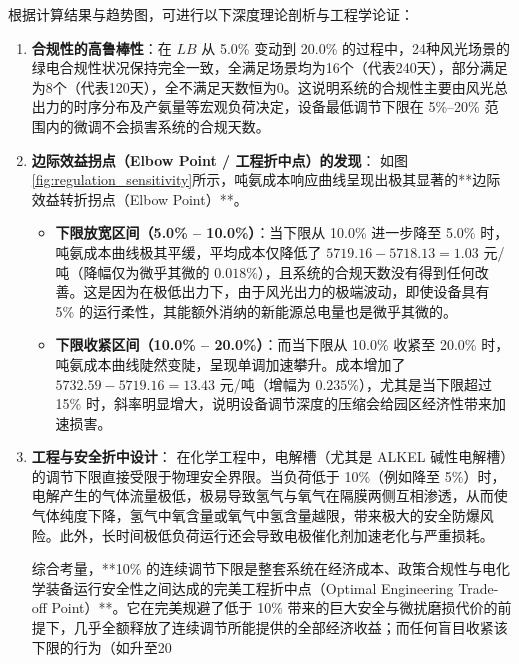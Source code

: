 根据计算结果与趋势图，可进行以下深度理论剖析与工程学论证：
\begin{enumerate}
    \item \textbf{合规性的高鲁棒性}：在 $LB$ 从 5.0\% 变动到 20.0\% 的过程中，24种风光场景的绿电合规性状况保持完全一致，全满足场景均为16个（代表240天），部分满足为8个（代表120天），全不满足天数恒为0。这说明系统的合规性主要由风光总出力的时序分布及产氨量等宏观负荷决定，设备最低调节下限在 5\%--20\% 范围内的微调不会损害系统的合规天数。
    \item \textbf{边际效益拐点（Elbow Point / 工程折中点）的发现}：
    如图\ref{fig:regulation_sensitivity}所示，吨氨成本响应曲线呈现出极其显著的**边际效益转折拐点（Elbow Point）**。
    \begin{itemize}
        \item \textbf{下限放宽区间（5.0\% -- 10.0\%）}：当下限从 10.0\% 进一步降至 5.0\% 时，吨氨成本曲线极其平缓，平均成本仅降低了 $5719.16 - 5718.13 = 1.03$ 元/吨（降幅仅为微乎其微的 $0.018\%$），且系统的合规天数没有得到任何改善。这是因为在极低出力下，由于风光出力的极端波动，即使设备具有 5\% 的运行柔性，其能额外消纳的新能源总电量也是微乎其微的。
        \item \textbf{下限收紧区间（10.0\% -- 20.0\%）}：而当下限从 10.0\% 收紧至 20.0\% 时，吨氨成本曲线陡然变陡，呈现单调加速攀升。成本增加了 $5732.59 - 5719.16 = 13.43$ 元/吨（增幅为 $0.235\%$），尤其是当下限超过 15\% 时，斜率明显增大，说明设备调节深度的压缩会给园区经济性带来加速损害。
    \end{itemize}
    \item \textbf{工程与安全折中设计}：
    在化学工程中，电解槽（尤其是 ALKEL 碱性电解槽）的调节下限直接受限于物理安全界限。当负荷低于 10\%（例如降至 5\%）时，电解产生的气体流量极低，极易导致氢气与氧气在隔膜两侧互相渗透，从而使气体纯度下降，氢气中氧含量或氧气中氢含量越限，带来极大的安全防爆风险。此外，长时间极低负荷运行还会导致电极催化剂加速老化与严重损耗。
    
    综合考量，**10\% 的连续调节下限是整套系统在经济成本、政策合规性与电化学装备运行安全性之间达成的完美工程折中点（Optimal Engineering Trade-off Point）**。它在完美规避了低于 10\% 带来的巨大安全与微扰磨损代价的前提下，几乎全额释放了连续调节所能提供的全部经济收益；而任何盲目收紧该下限的行为（如升至20%
\end{enumerate}

